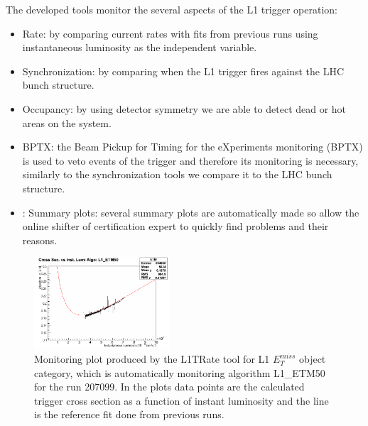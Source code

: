 \documentclass[%
reprint,
amsmath,
amssymb,
aps,
pra,
showkeys
]{revtex4-1}
\begin{document}
The developed tools monitor the several aspects of the L1 trigger operation:
\begin{itemize}
  \item Rate: by comparing current rates with fits from previous runs using instantaneous luminosity as the independent
              variable.
  \item Synchronization: by comparing when the L1 trigger fires against the LHC bunch structure.
  \item Occupancy: by using detector symmetry we are able to detect dead or hot areas on the system.
  \item BPTX: the Beam Pickup for Timing for the eXperiments monitoring (BPTX) is used to veto events of the trigger
              and therefore its monitoring is necessary, similarly to the synchronization tools we compare it to 
              the LHC bunch structure.
  \item: Summary plots: several summary plots are automatically made so allow the online shifter of certification 
         expert to quickly find problems and their reasons.
\end{itemize}

\begin{figure}[ht]
\centering
\includegraphics[width=0.45\textwidth]{img/L1TRate_L1_ETM50.png}
\caption{Monitoring plot produced by the L1TRate tool for L1 $E_T^{miss}$ object category, which is automatically
monitoring algorithm L1\_ETM50 for the run 207099. In the plots data points are the calculated trigger cross
section as a function of instant luminosity and the line is the reference fit done from previous runs.}
\label{figure_ServiceWork_L1TRate}
\end{figure}



\end{document}
